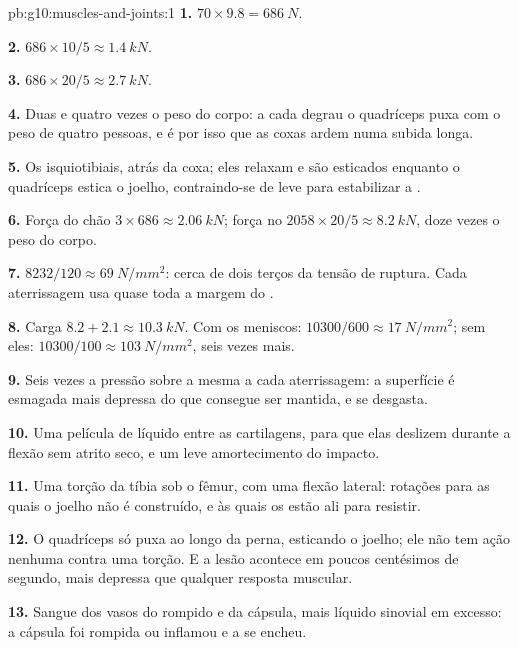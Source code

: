 \begin{solution}{pb:g10:muscles-and-joints:1}
\textbf{1.} $70 \times 9.8 = \qty{686}{N}$.

\textbf{2.} $686 \times 10/5 \approx \qty{1.4}{kN}$.

\textbf{3.} $686 \times 20/5 \approx \qty{2.7}{kN}$.

\textbf{4.} Duas e quatro vezes o peso do corpo: a cada degrau o
quadríceps puxa com o peso de quatro pessoas, e é por isso que as coxas
ardem numa subida longa.

\textbf{5.} Os isquiotibiais, atrás da coxa; eles relaxam e são
esticados enquanto o quadríceps estica o joelho, contraindo-se de leve
para estabilizar a .

\textbf{6.} Força do chão $3 \times 686 \approx \qty{2.06}{kN}$; força
no  $2058 \times 20/5 \approx \qty{8.2}{kN}$, doze vezes o peso
do corpo.

\textbf{7.} $8232/120 \approx \qty{69}{N/mm^2}$: cerca de dois terços
da tensão de ruptura. Cada aterrissagem usa quase toda a margem do
.

\textbf{8.} Carga $8.2 + 2.1 \approx \qty{10.3}{kN}$. Com os meniscos:
$10300/600 \approx \qty{17}{N/mm^2}$; sem eles: $10300/100 \approx
\qty{103}{N/mm^2}$, seis vezes mais.

\textbf{9.} Seis vezes a pressão sobre a mesma  a cada
aterrissagem: a superfície é esmagada mais depressa do que consegue ser
mantida, e se desgasta.

\textbf{10.} Uma película de líquido entre as cartilagens, para que
elas deslizem durante a flexão sem atrito seco, e um leve amortecimento
do impacto.

\textbf{11.} Uma torção da tíbia sob o fêmur, com uma flexão lateral:
rotações para as quais o joelho não é construído, e às quais os
 estão ali para resistir.

\textbf{12.} O quadríceps só puxa ao longo da perna, esticando o
joelho; ele não tem ação nenhuma contra uma torção. E a lesão acontece
em poucos centésimos de segundo, mais depressa que qualquer resposta
muscular.

\textbf{13.} Sangue dos vasos do  rompido e da cápsula, mais
líquido sinovial em excesso: a cápsula foi rompida ou inflamou e a
 se encheu.


\end{solution}

